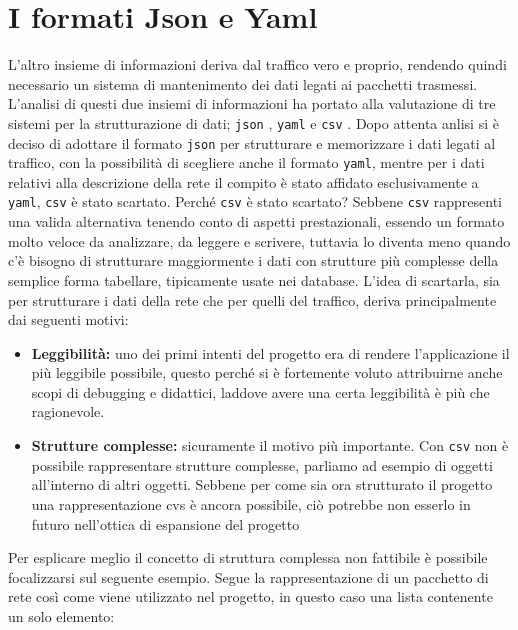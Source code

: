 \documentclass[binding=0.6cm]{sapthesis}
\begin{document}
\section{I formati Json e Yaml}
L'altro insieme di informazioni deriva dal traffico vero e proprio, rendendo quindi necessario un sistema di mantenimento dei dati legati ai pacchetti trasmessi. L'analisi di questi due insiemi di informazioni ha portato alla valutazione di tre sistemi per la strutturazione di dati; \texttt{json} \cite{rfc8259}, \texttt{yaml} \cite{RFC9512} e \texttt{csv} \cite{RFC4180}.
Dopo attenta anlisi si è deciso di adottare il formato \texttt{json} per strutturare e memorizzare i dati legati al traffico, con la possibilità di scegliere anche il formato \texttt{yaml}, mentre per i dati relativi alla descrizione della rete il compito è stato affidato esclusivamente a \texttt{yaml}, \texttt{csv} è stato scartato.
Perché \texttt{csv} è stato scartato? Sebbene \texttt{csv} rappresenti una valida alternativa tenendo conto di aspetti prestazionali, essendo un formato molto veloce da analizzare, da leggere e scrivere, tuttavia lo diventa meno quando c'è bisogno di strutturare maggiormente i dati con strutture più complesse della semplice forma tabellare, tipicamente usate nei database. 
L'idea di scartarla, sia per strutturare i dati della rete che per quelli del traffico, deriva principalmente dai seguenti motivi:

\begin{itemize}
    \item \textbf{Leggibilità:} uno dei primi intenti del progetto era di rendere l'applicazione il più leggibile possibile, questo perché si è
    fortemente voluto attribuirne anche scopi di debugging e didattici, laddove avere una certa leggibilità è più che ragionevole.
    \item \textbf{Strutture complesse:} sicuramente il motivo più importante. Con \texttt{csv} non è possibile rappresentare strutture complesse, parliamo ad esempio di oggetti
    all'interno di altri oggetti. Sebbene per come sia ora strutturato il progetto una rappresentazione cvs è ancora possibile, ciò potrebbe non esserlo in futuro
    nell'ottica di espansione del progetto
\end{itemize}
Per esplicare meglio il concetto di struttura complessa non fattibile è possibile focalizzarsi
 sul seguente esempio. Segue la rappresentazione di un pacchetto di rete così come viene
 utilizzato nel progetto, in questo caso una lista contenente un solo elemento:
\end{document}
